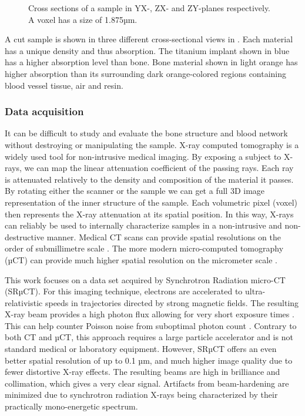 \begin{figure}
\begin{tabular}{cc}
  \end{tabular}
  \caption{
    Cross sections of a sample in YX-, ZX- and ZY-planes respectively. A voxel
    has a size of 1.875µm.
  }
\label{fig:3viewsample}
\end{figure}

A cut sample is shown in three different cross-sectional views in
. Each material has a unique density and thus absorption.
The titanium implant shown in blue has a higher absorption level than bone.
Bone material shown in light orange has higher absorption than its surrounding
dark orange-colored regions containing blood vessel tissue, air and resin.

\subsubsection{Data acquisition}

It can be difficult to study and evaluate the bone structure and blood network
without destroying or manipulating the sample. X-ray computed tomography is a
widely used tool for non-intrusive medical imaging. By exposing a subject to
X-rays, we can map the linear attenuation coefficient of the passing rays. Each
ray is attenuated relatively to the density and composition of the material it
passes. By rotating either the scanner or the sample we can get a full 3D image
representation of the inner structure of the sample. Each volumetric pixel
(voxel) then represents the X-ray attenuation at its spatial position. In this
way, X-rays can reliably be used to internally characterize samples in a
non-intrusive and non-destructive manner. Medical CT scans can provide spatial
resolutions on the order of submillimetre scale \citep{medicalct}. The more
modern micro-computed tomography (µCT) can provide much higher spatial
resolution on the micrometer scale \citep{srexptime}.

This work focuses on a data set acquired by Synchrotron Radiation micro-CT
(SRµCT). For this imaging technique, electrons are accelerated to
ultra-relativistic speeds in trajectories directed by strong magnetic fields.
The resulting X-ray beam provides a high photon flux allowing for very short
exposure times \citep{srexptime}. This can help counter Poisson noise from
suboptimal photon count \citep{srnoise}. Contrary to both CT and µCT, this
approach requires a large particle accelerator and is not standard medical or
laboratory equipment. However, SRµCT offers an even better spatial resolution
of up to 0.1 µm, and much higher image quality due to fewer distortive X-ray
effects. The resulting beams are high in brilliance and collimation, which
gives a very clear signal. Artifacts from beam-hardening are minimized due to
synchrotron radiation X-rays being characterized by their practically
mono-energetic spectrum.

